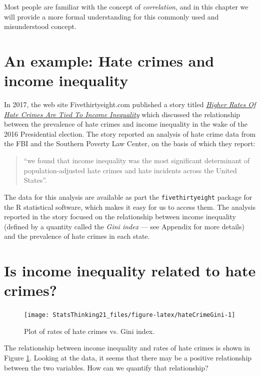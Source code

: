 \documentclass[12pt,]{book}
\theoremstyle{definition}
\theoremstyle{definition}
\theoremstyle{definition}
\theoremstyle{remark}
\begin{document}
Most people are familiar with the concept of \emph{correlation}, and in this chapter we will provide a more formal understanding for this commonly used and misunderstood concept.

\hypertarget{an-example-hate-crimes-and-income-inequality}{%
\section{An example: Hate crimes and income inequality}\label{an-example-hate-crimes-and-income-inequality}}

In 2017, the web site Fivethirtyeight.com published a story titled \href{https://fivethirtyeight.com/features/higher-rates-of-hate-crimes-are-tied-to-income-inequality/}{\emph{Higher Rates Of Hate Crimes Are Tied To Income Inequality}} which discussed the relationship between the prevalence of hate crimes and income inequality in the wake of the 2016 Presidential election. The story reported an analysis of hate crime data from the FBI and the Southern Poverty Law Center, on the basis of which they report:

\begin{quote}
``we found that income inequality was the most significant determinant of population-adjusted hate crimes and hate incidents across the United States''.
\end{quote}

The data for this analysis are available as part the \texttt{fivethirtyeight} package for the R statistical software, which makes it easy for us to access them. The analysis reported in the story focused on the relationship between income inequality (defined by a quantity called the \emph{Gini index} --- see Appendix for more details) and the prevalence of hate crimes in each state.

\hypertarget{is-income-inequality-related-to-hate-crimes}{%
\section{Is income inequality related to hate crimes?}\label{is-income-inequality-related-to-hate-crimes}}

\begin{figure}
\texttt{[image: StatsThinking21\_files/figure-latex/hateCrimeGini-1]} \caption{Plot of rates of hate crimes vs. Gini index.}\label{fig:hateCrimeGini}
\end{figure}

The relationship between income inequality and rates of hate crimes is shown in Figure \ref{fig:hateCrimeGini}.
Looking at the data, it seems that there may be a positive relationship between the two variables. How can we quantify that relationship?
\end{document}
